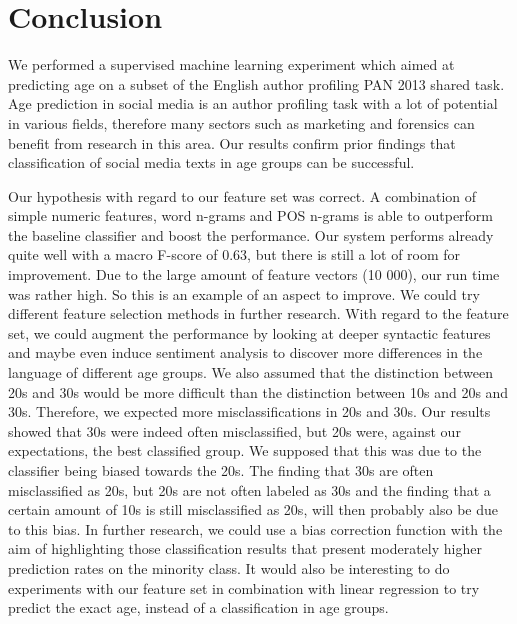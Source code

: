 \documentclass{clv3}
\begin{document}
\section{Conclusion}
We performed a supervised machine learning experiment which aimed at predicting age on a subset of the English author profiling PAN 2013 shared task. Age prediction in social media is an author profiling task with a lot of potential in various fields, therefore many sectors such as marketing and forensics can benefit from research in this area.  Our results confirm prior findings that  classification of social media texts in age groups can be successful. 

Our hypothesis with regard to our feature set was correct. A combination of simple numeric features, word n-grams and POS n-grams is able to outperform the baseline classifier and boost the performance. Our system performs already quite well with a macro F-score of 0.63, but there is still a lot of room for improvement. Due to the large amount of feature vectors (10 000), our run time was rather high. So this is an example of an aspect to improve. We could try different feature selection methods in further research. With regard to the feature set, we could augment the performance by looking at deeper syntactic features and maybe even induce sentiment analysis to discover more differences in the language of different age groups. We also assumed that the distinction between 20s and 30s would be more difficult than the distinction between 10s and 20s and 30s. Therefore, we expected more misclassifications in 20s and 30s. Our results showed that 30s were indeed often misclassified, but 20s were, against our expectations, the best classified group. We supposed that this was due to the classifier being biased towards the 20s. The finding that 30s are often misclassified as 20s, but 20s are not often  labeled as 30s and the finding that a certain amount of 10s is still misclassified as 20s, will then probably also be due to this bias. In further research, we could use a bias correction function with the aim of highlighting those classification results that present moderately higher prediction rates on the minority class.  It would also be interesting to do experiments with our feature set in combination with linear regression to try predict the exact age, instead of a classification in age groups.

\starttwocolumn



\pagebreak
\clearpage
\end{document}
